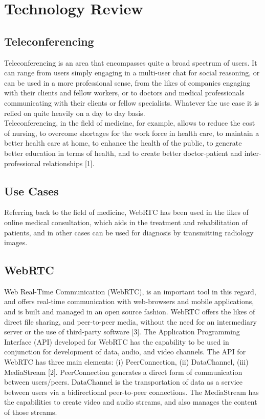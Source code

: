 \chapter{Technology Review}
\section{Teleconferencing}
Teleconferencing is an area that encompasses quite a broad spectrum of users. It can range from users simply engaging in a multi-user chat for social reasoning, or can be used in a more professional sense, from the likes of companies engaging with their clients and fellow workers, or to doctors and medical professionals communicating with their clients or fellow specialists. Whatever the use case it is relied on quite heavily on a day to day basis.
\\Teleconferencing, in the field of medicine, for example, allows to reduce the cost of nursing, to overcome shortages for the work force in health care, to maintain a better health care at home, to enhance the health of the public, to generate better education in terms of health, and to create better doctor-patient and inter-professional relationships [1]. 
\section{Use Cases}
Referring back to the field of medicine, WebRTC has been used in the likes of online medical consultation, which aids in the treatment and rehabilitation of patients, and in other cases can be used for diagnosis by transmitting radiology images.
\section{WebRTC}
Web Real-Time Communication (WebRTC), is an important tool in this regard, and offers real-time communication with web-browsers and mobile applications, and is built and managed in an open source fashion. WebRTC offers the likes of direct file sharing, and peer-to-peer media, without the need for an intermediary server or the use of third-party software [3]. The Application Programming Interface (API) developed for WebRTC has the capability to be used in conjunction for development of data, audio, and video channels. The API for WebRTC has three main elements: (i) PeerConnection, (ii) DataChannel, (iii) MediaStream [2]. PeerConnection generates a direct form of communication between users/peers. DataChannel is the transportation of data as a service between users via a bidirectional peer-to-peer connections. The MediaStream has the capabilities  to create video and audio streams, and also manages the content of those streams. 
